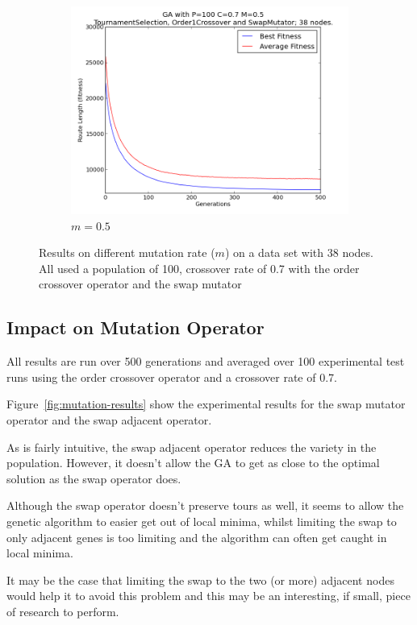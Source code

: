 \documentclass[10pt, a4paper]{article}
\begin{document}
\begin{figure}[h]
\begin{subfigure}[b]{0.67\textwidth}
\includegraphics[width=\textwidth]{img/results/order1crossover/swapmutator/n38p100c07m05}
\caption{$m = 0.5$}
\end{subfigure}
\caption{Results on different mutation rate ($m$) on a data set with 38 nodes.
         All used a population of 100, crossover rate of 0.7 with the order
         crossover operator and the swap mutator}
\label{fig:mutation-rate-results}
\end{figure}


\subsection{Impact on Mutation Operator}

All results are run over 500 generations and averaged over 100 experimental 
test runs using the order crossover operator and a crossover rate of 0.7.

Figure~\ref{fig:mutation-results} show the experimental results for the swap
mutator operator and the swap adjacent operator.

As is fairly intuitive, the swap adjacent operator reduces the variety in the
population. However, it doesn't allow the GA to get as close to the optimal
solution as the swap operator does.

Although the swap operator doesn't preserve tours as well, it seems to allow
the genetic algorithm to easier get out of local minima, whilst limiting the
swap to only adjacent genes is too limiting and the algorithm can often get
caught in local minima.

It may be the case that limiting the swap to the two (or more) adjacent nodes
would help it to avoid this problem and this may be an interesting, if small,
piece of research to perform.
\end{document}
